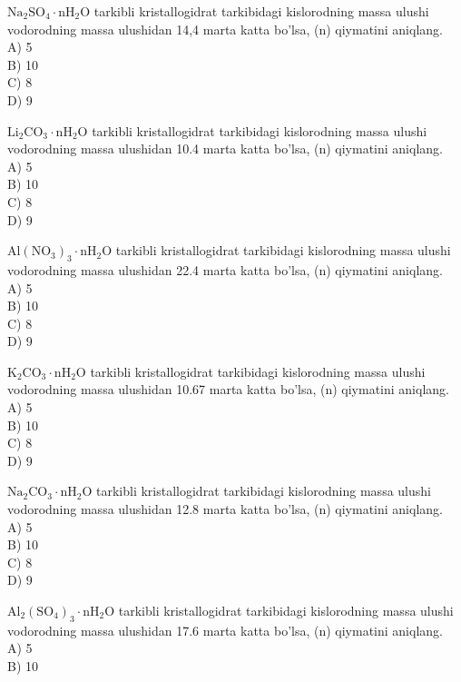   \item $\mathrm{Na}_{2} \mathrm{SO}_{4} \cdot \mathrm{nH}_{2} \mathrm{O}$ tarkibli kristallogidrat tarkibidagi kislorodning massa ulushi vodorodning massa ulushidan 14,4 marta katta bo'lsa, (n) qiymatini aniqlang.\\
A) 5\\
B) 10\\
C) 8\\
D) 9
  \item $\mathrm{Li}_{2} \mathrm{CO}_{3} \cdot \mathrm{nH}_{2} \mathrm{O}$ tarkibli kristallogidrat tarkibidagi kislorodning massa ulushi vodorodning massa ulushidan 10.4 marta katta bo'lsa, (n) qiymatini aniqlang.\\
A) 5\\
B) 10\\
C) 8\\
D) 9
  \item $\mathrm{Al}\left(\mathrm{NO}_{3}\right)_{3} \cdot \mathrm{nH}_{2} \mathrm{O}$ tarkibli kristallogidrat tarkibidagi kislorodning massa ulushi vodorodning massa ulushidan 22.4 marta katta bo'lsa, (n) qiymatini aniqlang.\\
A) 5\\
B) 10\\
C) 8\\
D) 9
  \item $\mathrm{K}_{2} \mathrm{CO}_{3} \cdot \mathrm{nH}_{2} \mathrm{O}$ tarkibli kristallogidrat tarkibidagi kislorodning massa ulushi vodorodning massa ulushidan 10.67 marta katta bo'lsa, (n) qiymatini aniqlang.\\
A) 5\\
B) 10\\
C) 8\\
D) 9
  \item $\mathrm{Na}_{2} \mathrm{CO}_{3} \cdot \mathrm{nH}_{2} \mathrm{O}$ tarkibli kristallogidrat tarkibidagi kislorodning massa ulushi vodorodning massa ulushidan 12.8 marta katta bo'lsa, (n) qiymatini aniqlang.\\
A) 5\\
B) 10\\
C) 8\\
D) 9
  \item $\mathrm{Al}_{2}\left(\mathrm{SO}_{4}\right)_{3} \cdot \mathrm{nH}_{2} \mathrm{O}$ tarkibli kristallogidrat tarkibidagi kislorodning massa ulushi vodorodning massa ulushidan 17.6 marta katta bo'lsa, (n) qiymatini aniqlang.\\
A) 5\\
B) 10\\
